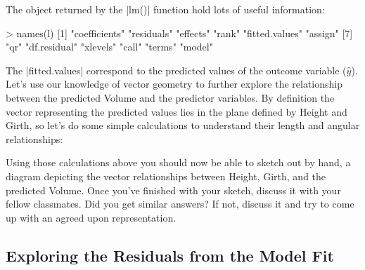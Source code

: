 The object returned by the |lm()| function hold lots of useful information:
%
\begin{R}
> names(l)
 [1] "coefficients"  "residuals"     "effects"       "rank"          "fitted.values" "assign"
 [7] "qr"            "df.residual"   "xlevels"       "call"          "terms"         "model"
\end{R}
%
The |fitted.values| correspond to the predicted values of the outcome variable ($\hat{y}$). Let's use our knowledge of vector geometry to further explore the relationship between the predicted Volume and the predictor variables.  By definition the vector representing the predicted values lies in the plane defined by Height and Girth, so let's do some simple calculations to understand their length and angular relationships:
%
%
Using those calculations above you should now be able to sketch out by hand, a diagram depicting the vector relationships between Height, Girth, and the predicted Volume.  Once you've finished with your sketch, discuss it with your fellow classmates.  Did you get similar answers? If not, discuss it and try to come up with an agreed upon representation.

\subsection{Exploring the Residuals from the Model Fit}

